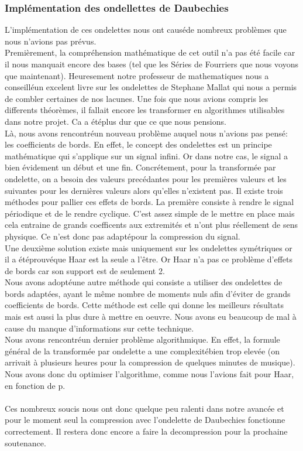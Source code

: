 \documentclass[a4paper,12pt]{article}
\begin{document}
\subsubsection{Impl\'ementation des ondellettes de Daubechies}
L'impl\'ementation de ces ondelettes nous ont caus\'ede nombreux
probl\`emes que nous n'avions pas pr\'evus.\\
Premi\`erement, la compr\'ehension math\'ematique de cet outil n'a pas \'et\'e
facile car il nous manquait encore des bases (tel que les S\'eries de
Fourriers que nous voyons que maintenant). Heuresement notre
professeur de mathematiques nous a conseill\'eun excelent livre sur les
ondelettes de Stephane Mallat qui nous a permis de combler certaines
de nos lacunes. Une fois que nous avions compris les differents
th\'eor\`emes, il fallait encore les transformer en algorithmes
utilisables
dans notre projet. Ca a \'et\'eplus dur que ce que nous pensions.\\
Là, nous avons rencontr\'eun nouveau probl\`eme auquel nous n'avions pas
pens\'e: les coefficients de bords. En effet, le concept des ondelettes
est un
principe math\'ematique qui s'applique sur un signal infini. Or dans
notre cas, le signal a bien \'evidement un d\'ebut et une
fin. Concr\'etement, pour la transform\'ee par ondelette, on a besoin des
valeurs prec\'edantes pour les premi\`eres valeurs et les suivantes pour
les derni\`eres valeurs alors qu'elles n'existent pas. Il existe trois
m\'ethodes pour pallier ces effets de bords. La premi\`ere consiste à
rendre le signal p\'eriodique et de le rendre cyclique. C'est assez
simple de le mettre en place mais cela entraine de grands coefficents
aux extremit\'es et n'ont plus r\'eellement de sens physique. Ce n'est
donc
pas adapt\'epour la compression du signal.\\
Une deuxi\`eme solution existe mais uniquement sur les ondelettes
sym\'etriques or il a \'et\'eprouv\'eque Haar est la seule a l'\^etre. Or Haar
n'a pas ce probl\`eme d'effets de bords car son support est de seulement
2.\\
Nous avons adopt\'eune autre m\'ethode qui consiste a utiliser des
ondelettes de bords adapt\'ees, ayant le m\^eme nombre de moments nuls
afin d'\'eviter de grands coefficients de bords. Cette m\'ethode est celle
qui donne les meilleurs r\'esultats mais est aussi la plus dure à mettre
en oeuvre. Nous avons eu beaucoup de mal à cause du manque
d'informations sur cette technique.\\
Nous avons rencontr\'eun dernier probl\`eme algorithmique. En effet, la
formule g\'en\'eral de la transform\'ee par ondelette a une complexit\'ebien
trop elev\'ee (on arrivait à plusieurs heures pour la compression de
quelques minutes de musique). Nous avons donc du optimiser
l'algorithme, comme nous l'avions fait pour Haar, en fonction de
p.\\\\
Ces nombreux soucis nous ont donc quelque peu ralenti dans notre
avanc\'ee et pour le moment seul la compression avec l'ondelette de
Daubechies fonctionne correctement. Il restera donc encore a faire la
decompression pour la prochaine soutenance.
\end{document}
